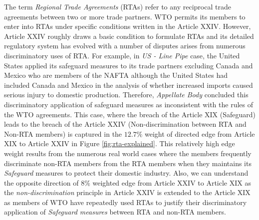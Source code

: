 The term \textit{Regional Trade Agreements} (RTAs)
refer to any reciprocal trade agreements between two or more trade partners. 
WTO permits its members to enter into RTAs under specific conditions written in the Article XXIV.
However, Article XXIV roughly draws a basic condition to formulate RTAs and its 
detailed regulatory system has evolved with a number of disputes arises 
from numerous discriminatory uses of RTA. For example,
in \textit{US - Line Pipe} case, 
the United States applied its safeguard measures to its trade partners excluding Canada and Mexico who are members of the NAFTA although 
the United States had included Canada and Mexico in the analysis of whether increased imports caused serious injury to domestic production.
Therefore, \textit{Appellate Body} concluded this discriminatory application of safeguard measures as inconsistent with the rules of the WTO agreements. 
This case, where the breach of the Article XIX (Safeguard) leads to the breach of the Article XXIV (Non-discrimination between RTA and Non-RTA members)
is captured in the $12.7\%$ weight of directed edge from Article XIX to Article XXIV in Figure \ref{fig:rta-explained}. 
This relatively high edge weight results from the numerous real world cases where the members frequently discriminate non-RTA members from the RTA members when they maintains its \textit{Safeguard} measures to protect their domestic industry.
Also, we can understand the opposite direction of $8\%$ weighted edge from Article XXIV to Article XIX as the \textit{non-discrimination} 
principle in Article XXIV is 
extended to the Article XIX as members of WTO have repeatedly used RTAs to justify their discriminatory application of \textit{Safeguard measures} between RTA and non-RTA members.%

